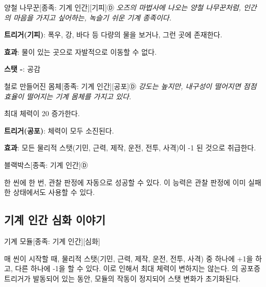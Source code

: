 \documentclass{report}
\begin{document}
	\begin{story}{양철 나무꾼}{[종족: 기계 인간][기피]Ⓓ}
		\textit{오즈의 마법사에 나오는 양철 나무꾼처럼, 인간의 마음을 가지고 싶어하는, 녹슬기 쉬운 기계 종족이다.}
		
		
		\textbf{트리거(기피)}: 폭우, 강, 바다 등 다량의 물을 보거나, 그런 곳에 존재한다.
		
		\textbf{효과}: 물이 있는 곳으로 자발적으로 이동할 수 없다.
		
		\smallskip
		
		\textbf{스탯 -}: 공감
		
	\end{story}
	
	\begin{story}{철로 만들어진 몸체}{[종족: 기계 인간][공포]Ⓓ}
		\textit{강도는 높지만, 내구성이 떨어지면 점점 효율이 떨어지는 기계 몸체를 가지고 있다.}
		
		
		\smallskip
		
		최대 체력이 20 증가한다.
		
		\smallskip
		
		\textbf{트리거(공포)}: 체력이 모두 소진된다.
		
		\textbf{효과}: 모든 물리적 스탯(기민, 근력, 제작, 운전, 전투, 사격)이 -1 된 것으로 취급한다.
		
	\end{story}
	
	\begin{story}{블랙박스}{[종족: 기계 인간]Ⓓ}
		
		한 씬에 한 번, 관찰 판정에 자동으로 성공할 수 있다. 이 능력은 관찰 판정에 이미 실패한 상태에서도 사용할 수 있다.
		
	\end{story}
	
	\subsection{기계 인간 심화 이야기}
	
	\begin{story}{기계 모듈}{[종족: 기계 인간][심화]}
		
		매 씬이 시작할 때, 물리적 스탯(기민, 근력, 제작, 운전, 전투, 사격) 중 하나에 +1을 하고, 다른 하나에 -1을 할 수 있다. 이로 인해서 최대 체력이 변하지는 않는다. 의 공포증 트리거가 발동되어 있는 동안, 모듈의 작동이 정지되어 스탯 변화가 초기화된다.
		
	\end{story}
	
\end{document}
